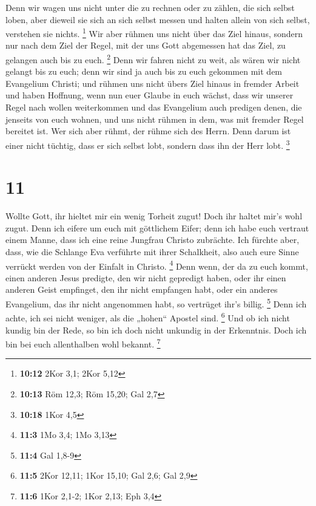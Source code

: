  Denn wir wagen uns nicht unter die zu rechnen oder zu
zählen, die sich selbst loben, aber dieweil sie sich an sich selbst
messen und halten allein von sich selbst, verstehen sie nichts.
\footnote{\textbf{10:12} 2Kor 3,1; 2Kor 5,12}  Wir aber
rühmen uns nicht über das Ziel hinaus, sondern nur nach dem Ziel der
Regel, mit der uns Gott abgemessen hat das Ziel, zu gelangen auch bis zu
euch. \footnote{\textbf{10:13} Röm 12,3; Röm 15,20; Gal 2,7}
 Denn wir fahren nicht zu weit, als wären wir nicht gelangt
bis zu euch; denn wir sind ja auch bis zu euch gekommen mit dem
Evangelium Christi;  und rühmen uns nicht übers Ziel hinaus
in fremder Arbeit und haben Hoffnung, wenn nun euer Glaube in euch
wächst, dass wir unserer Regel nach wollen weiterkommen 
und das Evangelium auch predigen denen, die jenseits von euch wohnen,
und uns nicht rühmen in dem, was mit fremder Regel bereitet ist.
 Wer sich aber rühmt, der rühme sich des Herrn.
 Denn darum ist einer nicht tüchtig, dass er sich selbst
lobt, sondern dass ihn der Herr lobt. \footnote{\textbf{10:18} 1Kor 4,5}

\hypertarget{section-5}{%
\section{11}\label{section-5}}

 Wollte Gott, ihr hieltet mir ein wenig Torheit zugut! Doch
ihr haltet mir's wohl zugut.  Denn ich eifere um euch mit
göttlichem Eifer; denn ich habe euch vertraut einem Manne, dass ich eine
reine Jungfrau Christo zubrächte.  Ich fürchte aber, dass,
wie die Schlange Eva verführte mit ihrer Schalkheit, also auch eure
Sinne verrückt werden von der Einfalt in Christo. \footnote{\textbf{11:3}
  1Mo 3,4; 1Mo 3,13}  Denn wenn, der da zu euch kommt, einen
anderen Jesus predigte, den wir nicht gepredigt haben, oder ihr einen
anderen Geist empfinget, den ihr nicht empfangen habt, oder ein anderes
Evangelium, das ihr nicht angenommen habt, so vertrüget ihr's billig.
\footnote{\textbf{11:4} Gal 1,8-9}  Denn ich achte, ich sei
nicht weniger, als die „hohen`` Apostel sind. \footnote{\textbf{11:5}
  2Kor 12,11; 1Kor 15,10; Gal 2,6; Gal 2,9}  Und ob ich
nicht kundig bin der Rede, so bin ich doch nicht unkundig in der
Erkenntnis. Doch ich bin bei euch allenthalben wohl bekannt. \footnote{\textbf{11:6}
  1Kor 2,1-2; 1Kor 2,13; Eph 3,4}

